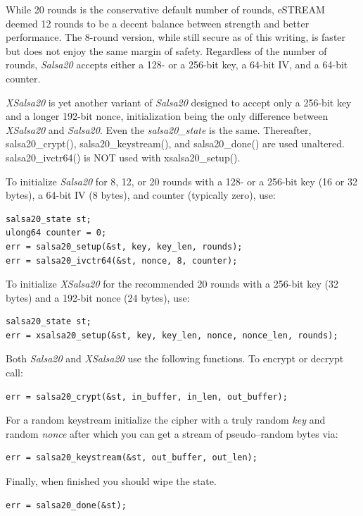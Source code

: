 \documentclass[synpaper]{book}
\begin{document}
While 20 rounds is the conservative default number of rounds, eSTREAM deemed
12 rounds to be a decent balance between strength and better performance.
The 8-round version, while still secure as of this writing, is faster but
does not enjoy the same margin of safety.  Regardless of the number of rounds,
\textit{Salsa20} accepts either a 128- or a 256-bit key, a 64-bit IV, and a
64-bit counter.
\vspace{1mm}

\textit{XSalsa20} is yet another variant of \textit{Salsa20} designed to accept
only a 256-bit key and a longer 192-bit nonce, initialization being the only
difference between \textit{XSalsa20} and \textit{Salsa20}.  Even the
\textit{salsa20\_state} is the same.  Thereafter, salsa20\_crypt(),
salsa20\_keystream(), and salsa20\_done() are used unaltered.
salsa20\_ivctr64() is NOT used with xsalsa20\_setup().
\vspace{1mm}

To initialize \textit{Salsa20} for 8, 12, or 20 rounds with a 128- or a
256-bit key (16 or 32 bytes), a 64-bit IV (8 bytes), and counter (typically
zero), use:

\begin{verbatim}
salsa20_state st;
ulong64 counter = 0;
err = salsa20_setup(&st, key, key_len, rounds);
err = salsa20_ivctr64(&st, nonce, 8, counter);
\end{verbatim}

To initialize \textit{XSalsa20} for the recommended 20 rounds with a 256-bit
key (32 bytes) and a 192-bit nonce (24 bytes), use:

\begin{verbatim}
salsa20_state st;
err = xsalsa20_setup(&st, key, key_len, nonce, nonce_len, rounds);
\end{verbatim}

Both \textit{Salsa20} and \textit{XSalsa20} use the following functions.  To
encrypt or decrypt call:
\begin{verbatim}
err = salsa20_crypt(&st, in_buffer, in_len, out_buffer);
\end{verbatim}

For a random keystream initialize the cipher with a truly random \textit{key}
and random \textit{nonce} after which you can get a stream of
pseudo--random bytes via:
\begin{verbatim}
err = salsa20_keystream(&st, out_buffer, out_len);
\end{verbatim}

Finally, when finished you should wipe the state.
\begin{verbatim}
err = salsa20_done(&st);
\end{verbatim}
\end{document}
